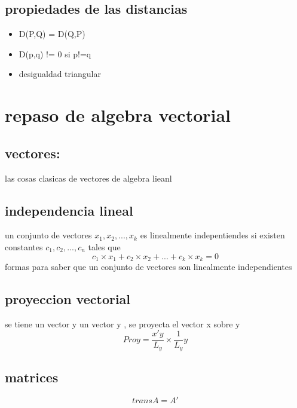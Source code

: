 \documentclass[10pt,a4paper]{article} %
\begin{document}
            \subsection{propiedades de las distancias}
            \begin{itemize}
                \item {D(P,Q) = D(Q,P)} 
                \item {D(p,q) != 0 si p!=q} 
                \item {desigualdad triangular} 
            \end{itemize}	
            
            \section{repaso de algebra vectorial}
                \subsection{vectores:}
                    las cosas clasicas de vectores de algebra lieanl
                \subsection{independencia lineal}
                    un conjunto de vectores $ x_1 , x_2 , ... , x_k  $ es
                    linealmente indepentiendes si existen constantes $ c_1 ,
                    c_2 , ... , c_n  $ tales que     
                    \begin{equation}
                        c_1 \times x_1 + c_2 \times x_2 + ... + c_k \times x_k  = 0
                    \end{equation}
                    formas para saber que un conjunto de vectores son
                    linealmente independientes 
                \subsection{proyeccion vectorial}
                    se tiene un vector y un vector y , se proyecta el vector x sobre y
                    \begin{equation}
                        Proy = \frac{x'y}{L_y} \times \frac{1}{L_y}y
                    \end{equation}
                \subsection{matrices}
                    \begin{equation}
                        transA = A'
                    \end{equation}
\end{document}
